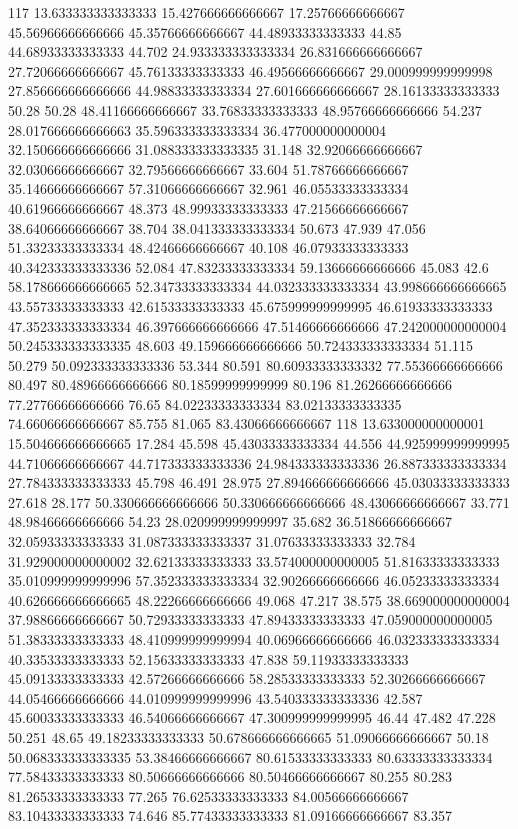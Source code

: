 117 13.633333333333333 15.427666666666667 17.25766666666667 45.56966666666666 45.35766666666667 44.48933333333333 44.85 44.68933333333333 44.702 24.933333333333334 26.831666666666667 27.72066666666667 45.76133333333333 46.49566666666667 29.000999999999998 27.856666666666666 44.98833333333334 27.601666666666667 28.16133333333333 50.28 50.28 48.41166666666667 33.76833333333333 48.95766666666666 54.237 28.017666666666663 35.596333333333334 36.477000000000004 32.150666666666666 31.088333333333335 31.148 32.92066666666667 32.03066666666667 32.79566666666667 33.604 51.78766666666667 35.14666666666667 57.31066666666667 32.961 46.05533333333334 40.61966666666667 48.373 48.99933333333333 47.21566666666667 38.64066666666667 38.704 38.041333333333334 50.673 47.939 47.056 51.33233333333334 48.42466666666667 40.108 46.07933333333333 40.342333333333336 52.084 47.83233333333334 59.13666666666666 45.083 42.6 58.178666666666665 52.34733333333334 44.032333333333334 43.998666666666665 43.55733333333333 42.61533333333333 45.675999999999995 46.61933333333333 47.352333333333334 46.397666666666666 47.51466666666666 47.242000000000004 50.245333333333335 48.603 49.159666666666666 50.724333333333334 51.115 50.279 50.092333333333336 53.344 80.591 80.60933333333332 77.55366666666666 80.497 80.48966666666666 80.18599999999999 80.196 81.26266666666666 77.27766666666666 76.65 84.02233333333334 83.02133333333335 74.66066666666667 85.755 81.065 83.43066666666667
118 13.633000000000001 15.504666666666665 17.284 45.598 45.43033333333334 44.556 44.925999999999995 44.71066666666667 44.717333333333336 24.984333333333336 26.887333333333334 27.784333333333333 45.798 46.491 28.975 27.894666666666666 45.03033333333333 27.618 28.177 50.330666666666666 50.330666666666666 48.43066666666667 33.771 48.98466666666666 54.23 28.020999999999997 35.682 36.51866666666667 32.05933333333333 31.087333333333337 31.07633333333333 32.784 31.929000000000002 32.62133333333333 33.574000000000005 51.81633333333333 35.010999999999996 57.352333333333334 32.90266666666666 46.05233333333334 40.626666666666665 48.22266666666666 49.068 47.217 38.575 38.669000000000004 37.98866666666667 50.72933333333333 47.89433333333333 47.059000000000005 51.38333333333333 48.410999999999994 40.06966666666666 46.032333333333334 40.33533333333333 52.15633333333333 47.838 59.11933333333333 45.09133333333333 42.57266666666666 58.28533333333333 52.30266666666667 44.05466666666666 44.010999999999996 43.540333333333336 42.587 45.60033333333333 46.54066666666667 47.300999999999995 46.44 47.482 47.228 50.251 48.65 49.18233333333333 50.678666666666665 51.09066666666667 50.18 50.068333333333335 53.38466666666667 80.61533333333333 80.63333333333334 77.58433333333333 80.50666666666666 80.50466666666667 80.255 80.283 81.26533333333333 77.265 76.62533333333333 84.00566666666667 83.10433333333333 74.646 85.77433333333333 81.09166666666667 83.357
